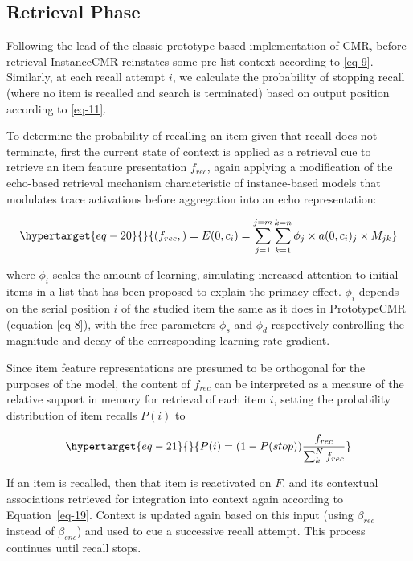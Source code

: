 \documentclass[
  letterpaper,
  DIV=11,
  numbers=noendperiod]{scrreport}
\begin{document}
\hypertarget{retrieval-phase-1}{%
\subsection{Retrieval Phase}\label{retrieval-phase-1}}

Following the lead of the classic prototype-based implementation of CMR,
before retrieval InstanceCMR reinstates some pre-list context according
to \ref{eq-9}. Similarly, at each recall attempt \(i\), we calculate the
probability of stopping recall (where no item is recalled and search is
terminated) based on output position according to \ref{eq-11}.

To determine the probability of recalling an item given that recall does
not terminate, first the current state of context is applied as a
retrieval cue to retrieve an item feature presentation \(f_{rec}\),
again applying a modification of the echo-based retrieval mechanism
characteristic of instance-based models that modulates trace activations
before aggregation into an echo representation:

\begin{equation}\protect\hypertarget{eq-20}{}{
(f_{rec},) = E(0, c_i) = \sum^{j=m}_{j=1}\sum^{k=n}_{k=1} {\phi}_j \times a(0, c_i)_j \times M_{jk}
}\label{eq-20}\end{equation}

where \({\phi}_i\) scales the amount of learning, simulating increased
attention to initial items in a list that has been proposed to explain
the primacy effect. \({\phi}_i\) depends on the serial position \(i\) of
the studied item the same as it does in PrototypeCMR (equation
\ref{eq-8}), with the free parameters \({\phi}_s\) and \({\phi}_d\)
respectively controlling the magnitude and decay of the corresponding
learning-rate gradient.

Since item feature representations are presumed to be orthogonal for the
purposes of the model, the content of \(f_{rec}\) can be interpreted as
a measure of the relative support in memory for retrieval of each item
\(i\), setting the probability distribution of item recalls \(P(i)\) to

\begin{equation}\protect\hypertarget{eq-21}{}{
P(i) = (1-P(stop))\frac{f_{rec}}{\sum_{k}^{N}f_{rec}}
}\label{eq-21}\end{equation}

If an item is recalled, then that item is reactivated on \(F\), and its
contextual associations retrieved for integration into context again
according to Equation~\ref{eq-19}. Context is updated again based on
this input (using \(\beta_{rec}\) instead of \(\beta_{enc}\)) and used
to cue a successive recall attempt. This process continues until recall
stops.
\end{document}
